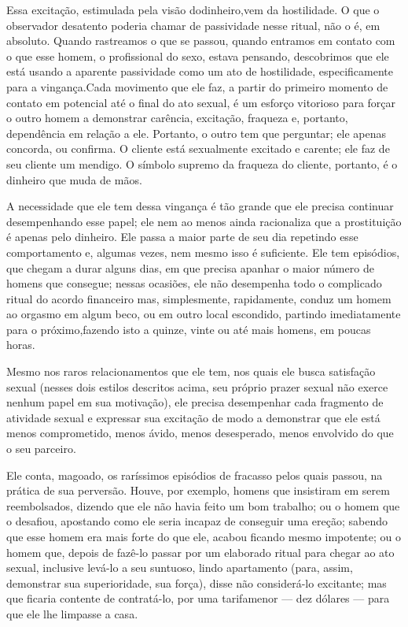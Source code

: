 Essa excitação, estimulada pela visão do\idxprostdin[|(] dinheiro,\idxprosthos[|(] vem da
hostilidade.\idxhostpros{} O que o observador desatento poderia chamar de passividade
nesse ritual, não o é, em absoluto. Quando rastreamos o que se passou,
quando entramos em contato com o que esse homem, o profissional do
sexo, estava pensando, descobrimos que ele está usando a aparente
passividade como um ato de hostilidade, especificamente para a
vingança.\idxvingapro[|(] Cada movimento que ele faz, a partir do primeiro momento de
contato em potencial até o final do ato sexual, é um esforço vitorioso
para forçar o outro homem a demonstrar carência, excitação, fraqueza e,
portanto, dependência em relação a ele. Portanto, o outro tem que
perguntar; ele apenas concorda, ou confirma. O cliente está sexualmente
excitado e carente; ele faz de seu cliente um mendigo. O símbolo
supremo da fraqueza do cliente, portanto, é o dinheiro que muda de
mãos.

A necessidade que ele tem dessa vingança é tão grande que ele
precisa continuar desempenhando esse papel; ele nem ao menos ainda
racionaliza que a prostituição é apenas pelo dinheiro. Ele passa a
maior parte de seu dia repetindo esse comportamento e, algumas vezes,
nem mesmo isso é suficiente. Ele tem episódios, que chegam a durar
alguns dias, em que precisa apanhar o maior número de homens que
consegue; nessas ocasiões, ele não desempenha todo o complicado ritual
do acordo financeiro mas, simplesmente, rapidamente, conduz um homem ao
orgasmo em algum beco, ou em outro local escondido, partindo
imediatamente para o próximo,\idxvingapro[|)] fazendo isto a quinze, vinte ou até mais
homens, em poucas horas.

Mesmo nos raros relacionamentos que ele tem, nos quais ele busca
satisfação sexual (nesses dois estilos descritos acima, seu próprio
prazer sexual não exerce nenhum papel em sua motivação), ele precisa
desempenhar cada fragmento de atividade sexual e expressar sua
excitação de modo a demonstrar que ele está menos comprometido, menos
ávido, menos desesperado, menos envolvido do que o seu parceiro.

Ele conta, magoado, os raríssimos episódios de fracasso pelos quais
passou, na prática de sua perversão. Houve, por exemplo, homens que
insistiram em serem reembolsados, dizendo que ele não havia feito um
bom trabalho; ou o homem que o desafiou, apostando como ele seria
incapaz de conseguir uma ereção; sabendo que esse homem era mais forte
do que ele, acabou ficando mesmo impotente;\idxprostpot{} ou o homem que, depois de
fazê-lo passar por um elaborado ritual para chegar ao ato sexual,
inclusive levá-lo a seu suntuoso, lindo apartamento (para, assim,
demonstrar sua superioridade, sua força), disse não considerá-lo
excitante; mas que ficaria contente de contratá-lo, por uma tarifa\idxprosthos[|)]
menor --- dez dólares --- para que ele lhe limpasse a casa.\idxprostdin[|)]

